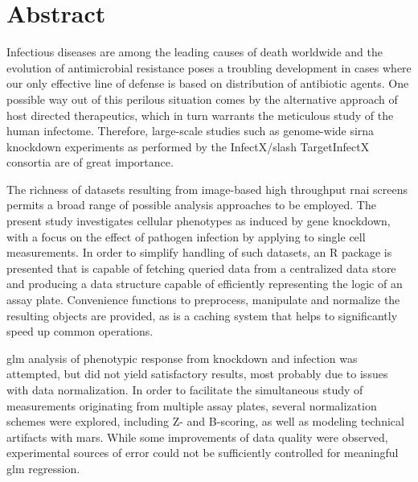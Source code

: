 \chapter{Abstract}

Infectious diseases are among the leading causes of death worldwide and the evolution of antimicrobial resistance poses a troubling development in cases where our only effective line of defense is based on distribution of antibiotic agents. One possible way out of this perilous situation comes by the alternative approach of host directed therapeutics, which in turn warrants the meticulous study of the human infectome. Therefore, large-scale studies such as genome-wide \acrshort{sirna} knockdown experiments as performed by the InfectX/slash TargetInfectX consortia are of great importance.

The richness of datasets resulting from image-based high throughput \acrshort{rnai} screens permits a broad range of possible analysis approaches to be employed. The present study investigates cellular phenotypes as induced by gene knockdown, with a focus on the effect of pathogen infection by applying  to single cell measurements. In order to simplify handling of such datasets, an R package is presented that is capable of fetching queried data from a centralized data store and producing a data structure capable of efficiently representing the logic of an assay plate. Convenience functions to preprocess, manipulate and normalize the resulting objects are provided, as is a caching system that helps to significantly speed up common operations.

\acrshort{glm} analysis of phenotypic response from knockdown and infection was attempted, but did not yield satisfactory results, most probably due to issues with data normalization. In order to facilitate the simultaneous study of measurements originating from multiple assay plates, several normalization schemes were explored, including Z- and B-scoring, as well as modeling technical artifacts with \acrfull{mars}. While some improvements of data quality were observed, experimental sources of error could not be sufficiently controlled for meaningful \acrshort{glm} regression.